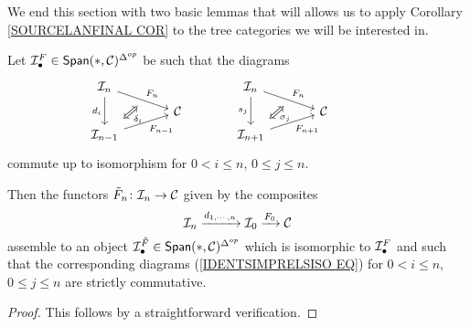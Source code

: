 \documentclass[a4paper,10pt]{article}%
\begin{document}
We end this section with two basic lemmas that will allows us to apply Corollary \ref{SOURCELANFINAL COR}
to the tree categories we will be interested in.

\begin{lemma}\label{TWISTING LEMMA}
	Let $\mcI_{\bullet}^F \in \mathsf{Span}(\**,\C)^{\Delta^{op}}$ be such that the diagrams
	\begin{equation}\label{IDENTSIMPRELSISO EQ}
	\begin{tikzcd}[row sep=0.4em,column sep = 3.5em]
		\mathcal{I}_n
		\ar{dr}[name=F1]{F_n} \ar{dd}[swap]{d_i} & &
		\mathcal{I}_n
		\ar{dr}[name=F2]{F_n} \ar{dd}[swap]{s_j} & &
	\\
 & \C & & \C &
	\\
|[alias=G2]| \mathcal{I}_{n-1}  \ar{ur}[swap]{F_{n-1}} & & 
|[alias=G3]| \mathcal{I}_{n+1}  \ar{ur}[swap]{F_{n+1}} & &
		\arrow[Leftrightarrow, from=F1, to=G2,shorten >=0.25cm,shorten <=0.25cm,"\delta_{i}"]
		\arrow[Leftrightarrow, from=F2, to=G3,shorten >=0.25cm,shorten <=0.25cm,"\sigma_{j}"]
	\end{tikzcd}
\end{equation}
commute up to isomorphism for $0 < i \leq n$, $0 \leq j \leq n$.

Then the functors $\tilde{F}_n \colon \mathcal{I}_n \to \mathcal{C}$ given by the composites
\[
\mathcal{I}_n \xrightarrow{d_{1,\cdots,n}} 
\mathcal{I}_0 \xrightarrow{F_0}
\mathcal{C}
\]
assemble to an object 
$\mcI_{\bullet}^{\tilde{F}} \in \mathsf{Span}(\**,\C)^{\Delta^{op}}$ which is isomorphic to $\mathcal{I}_{\bullet}^F$ and such that the corresponding diagrams (\ref{IDENTSIMPRELSISO EQ}) for $0 < i \leq n$, $0 \leq j \leq n$ are strictly commutative.
\end{lemma}


\begin{proof}
This follows by a straightforward verification.
\end{proof}
\end{document}
